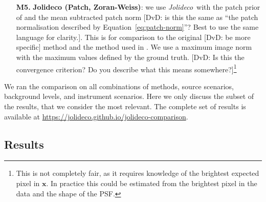 \documentclass[twocolumn]{aastex631}
\newcommand{\jolideco}{\textit{Jolideco}~}
\newcommand{\dvd}[1]{{\color{red} [DvD: #1]}}
\begin{document}
\begin{enumerate}
        \item[\bf M5.] \textbf{Jolideco (Patch, Zoran-Weiss)}: we use \jolideco with the patch prior of \cite{Zoran2011} and the mean subtracted patch norm \dvd{is this the same as ``the patch normalisation described by Equation~\ref{eq:patch-norm}''? Best to use the same language for clarity.}. This is for comparison to the original \dvd{be more specific} method and the method used in \cite{Bouman2016}. We use a maximum image norm with the maximum values defined by the ground truth. \dvd{Is this the convergence criterion? Do you describe what this means somewhere?}\footnote{This is not completely fair, as it requires knowledge of the brightest expected pixel in $\mathbf{x}$. In practice this could be estimated from the brightest pixel in the data and the shape of the PSF.}
    \end{enumerate}

    We ran the comparison on all combinations of methods, source scenarios, background levels, and instrument scenarios. Here we only discuss the subset of the results, that we consider the most relevant. The complete set of results is available at \url{https://jolideco.github.io/jolideco-comparison}.

    \subsection{Results}
\end{document}
